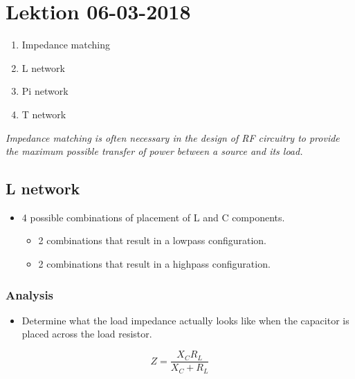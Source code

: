 \section{Lektion 06-03-2018}

\begin{enumerate}
	\item Impedance matching
	\item L network
	\item Pi network
	\item T network
\end{enumerate}

\noindent{} \vspace{3mm}

\noindent\textit{Impedance matching is often necessary in the design of RF circuitry to provide the maximum possible transfer of power	between a source and its load.}

\subsection{L network}
\begin{itemize}
	\item 4 possible combinations of placement of L and C components.
	\begin{itemize}
		\item 2 combinations that result in a lowpass configuration.
		\item 2 combinations that result in a highpass configuration.
	\end{itemize}
\end{itemize}

\subsubsection{Analysis}
\begin{itemize}
	\item Determine what the load impedance actually looks
	like when the capacitor is placed across the load resistor.
\end{itemize}

\begin{equation}
Z = \dfrac{X_C R_L}{X_C+R_L}
\end{equation}

